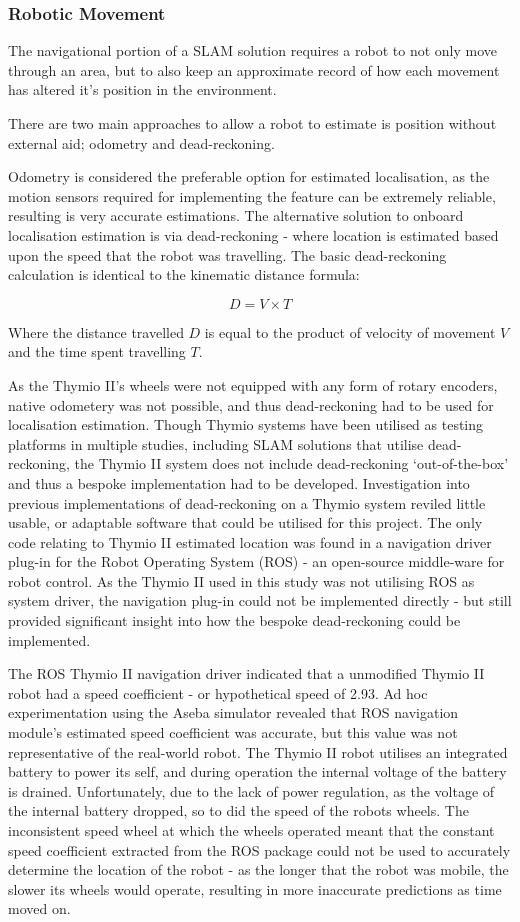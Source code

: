 \subsubsection{Robotic Movement}
The navigational portion of a SLAM solution requires a robot to not only move
through an area, but to also keep an approximate record of how each movement
has altered it's position in the environment.

There are two main approaches to allow a robot to estimate is position
without external aid; odometry and dead-reckoning.

Odometry is considered the preferable option for estimated localisation, as
the motion sensors required for implementing the feature can be extremely
reliable, resulting is very accurate estimations.
The alternative solution to onboard localisation estimation is via
dead-reckoning - where location is estimated based upon the speed that the
robot was travelling.
The basic dead-reckoning calculation is identical to the kinematic
distance formula:

\[ D = V \times T \]

Where the distance travelled \(D\) is equal to the product of velocity of
movement \(V\) and the time spent travelling \(T\).

As the Thymio II's wheels were not equipped with any form of rotary encoders,
native odometery was not possible, and thus dead-reckoning had to be used for
localisation estimation.
Though Thymio systems have been utilised as testing platforms in multiple
studies, including SLAM solutions that utilise dead-reckoning, the Thymio II
system does not include dead-reckoning `out-of-the-box' and thus a bespoke
implementation had to be developed.
Investigation into previous implementations of dead-reckoning on a Thymio
system reviled little usable, or adaptable software that could be utilised for
this project.
The only code relating to Thymio II estimated location was found in a
navigation driver plug-in for the Robot Operating System (ROS) - an open-source
middle-ware for robot control.
As the Thymio II used in this study was not utilising ROS as system driver,
the navigation plug-in could not be implemented directly - but still provided
significant insight into how the bespoke dead-reckoning could be implemented.

The ROS Thymio II navigation driver indicated that a unmodified Thymio II
robot had a speed coefficient - or hypothetical speed of 2.93.
Ad hoc experimentation using the Aseba simulator revealed that ROS navigation
module's estimated speed coefficient was accurate, but this value was not
representative of the real-world robot.
The Thymio II robot utilises an integrated battery to power its self, and
during operation the internal voltage of the battery is drained.
Unfortunately, due to the lack of power regulation, as the voltage of the
internal battery dropped, so to did the speed of the robots wheels.
The inconsistent speed wheel at which the wheels operated meant that the
constant speed coefficient extracted from the ROS package could not be used to
accurately determine the location of the robot - as the longer that the robot
was mobile, the slower its wheels would operate, resulting in more inaccurate
predictions as time moved on.


